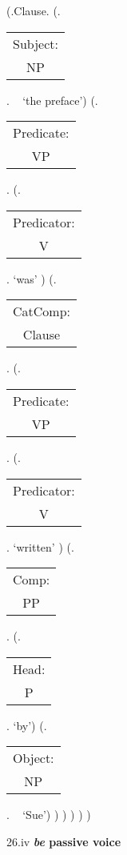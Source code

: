 \documentclass[12pt,letterpaper]{article}
\begin{document}
\begin{figure}
	\begin{center}
		\begin{parsetree}
			(.Clause.
			(.\begin{tabular}{c}Subject:\\NP\end{tabular}. ~ `the preface')
			(.\begin{tabular}{c}Predicate:\\VP\end{tabular}.
			(.\begin{tabular}{c}Predicator:\\V\end{tabular}. `was' )
			(.\begin{tabular}{c}CatComp:\\Clause\end{tabular}. 
			(.\begin{tabular}{c}Predicate:\\VP\end{tabular}.
			(.\begin{tabular}{c}Predicator:\\V\end{tabular}. `written' )
			(.\begin{tabular}{c}Comp:\\PP\end{tabular}. 
			(.\begin{tabular}{c}Head:\\P\end{tabular}. `by')
			(.\begin{tabular}{c}Object:\\NP\end{tabular}. ~ `Sue')
			)
			)
			)
			)
			)
			
		\end{parsetree}
		\hfill \break \hfill \break
		26.iv \textbf{\textit{be}  passive voice}
	\end{center}
\end{figure}
\end{document}
